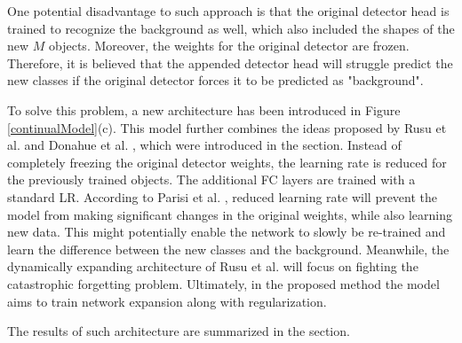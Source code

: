 \documentclass[english, 12pt, a4paper, elec, utf8, a-1b, online]{aaltothesis}
\begin{document}
One potential disadvantage to such approach is that the original detector head is trained to recognize the background as well, which also included the shapes of the new $M$ objects. Moreover, the weights for the original detector are frozen. Therefore, it is believed that the appended detector head will struggle predict the new classes if the original detector forces it to be predicted as "background". 

To solve this problem, a new architecture has been introduced in Figure \ref{continualModel}(c). This model further combines the ideas proposed by Rusu et al. \cite{Rusu2016} and Donahue et al. \cite{Donahue2013}, which were introduced in the  section. Instead of completely freezing the original detector weights, the learning rate is reduced for the previously trained objects. The additional FC layers are trained with a standard LR.  According to Parisi et al. \cite{Parisi2018}, reduced learning rate will prevent the model from making significant changes in the original weights, while also learning new data. This might potentially enable the network to slowly be re-trained and learn the difference between the new classes and the background. Meanwhile, the dynamically expanding architecture of Rusu et al. \cite{Rusu2016} will focus on fighting the catastrophic forgetting problem. Ultimately, in the proposed method the model aims to train network expansion along with regularization. 

The results of such architecture are summarized in the  section. 
\end{document}
